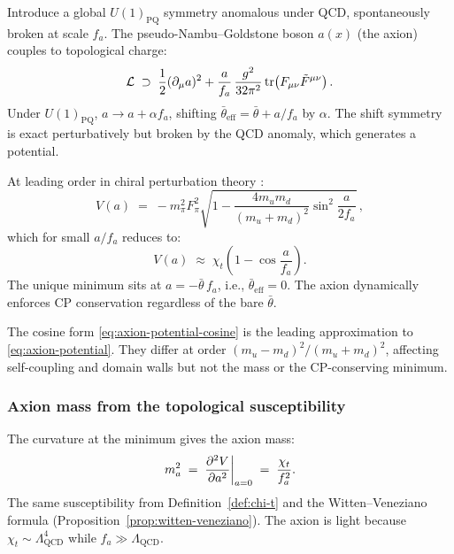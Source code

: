 Introduce a global $U(1)_{\mathrm{PQ}}$ symmetry anomalous under QCD, spontaneously broken at scale $f_a$.  The pseudo-Nambu--Goldstone boson $a(x)$ (the axion) couples to topological charge:
\begin{equation}\label{eq:axion-coupling}
  \mathcal{L} \;\supset\; \frac{1}{2}(\partial_\mu a)^2 + \frac{a}{f_a}\,\frac{g^2}{32\pi^2}\operatorname{tr}\!\left(F_{\mu\nu}\tilde{F}^{\mu\nu}\right).
\end{equation}
Under $U(1)_{\mathrm{PQ}}$, $a\to a + \alpha f_a$, shifting $\bar\theta_{\mathrm{eff}} = \bar\theta + a/f_a$ by $\alpha$.  The shift symmetry is exact perturbatively but broken by the QCD anomaly, which generates a potential.

At leading order in chiral perturbation theory \cite{Hook2018TASIStrongCPAxions}:
\begin{equation}\label{eq:axion-potential}
  V(a) \;=\; -m_\pi^2 F_\pi^2\sqrt{1 - \frac{4m_u m_d}{(m_u+m_d)^2}\sin^2\!\frac{a}{2f_a}}\,,
\end{equation}
which for small $a/f_a$ reduces to:
\begin{equation}\label{eq:axion-potential-cosine}
  V(a) \;\approx\; \chi_t\left(1 - \cos\frac{a}{f_a}\right).
\end{equation}
The unique minimum sits at $a = -\bar\theta\, f_a$, i.e., $\bar\theta_{\mathrm{eff}} = 0$.  The axion dynamically enforces CP conservation regardless of the bare $\bar\theta$.

\begin{remark}
The cosine form \eqref{eq:axion-potential-cosine} is the leading approximation to \eqref{eq:axion-potential}. They differ at order $(m_u - m_d)^2/(m_u + m_d)^2$, affecting self-coupling and domain walls but not the mass or the CP-conserving minimum.
\end{remark}

\subsubsection{Axion mass from the topological susceptibility}

The curvature at the minimum gives the axion mass:
\begin{equation}\label{eq:axion-mass}
  m_a^2 \;=\; \frac{\partial^2 V}{\partial a^2}\bigg|_{a=0} \;=\; \frac{\chi_t}{f_a^2}.
\end{equation}
The same susceptibility from Definition~\ref{def:chi-t} and the Witten--Veneziano formula (Proposition~\ref{prop:witten-veneziano}).  The axion is light because $\chi_t\sim\Lambda_{\mathrm{QCD}}^4$ while $f_a\gg\Lambda_{\mathrm{QCD}}$.

